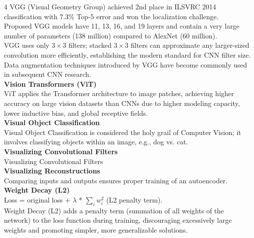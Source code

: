 \documentclass[8pt]{extarticle}
\begin{document}
\begin{multicols}{4}
{VGG (Visual Geometry Group) achieved 2nd place in ILSVRC 2014 classification with 7.3\% Top-5 error and won the localization challenge.\\
Proposed VGG models have 11, 13, 16, and 19 layers and contain a very large number of parameters (138 million) compared to AlexNet (60 million).\\
VGG uses only $3\times3$ filters; stacked $3\times3$ filters can approximate any larger-sized convolution more efficiently, establishing the modern standard for CNN filter size.\\
Data augmentation techniques introduced by VGG have become commonly used in subsequent CNN research.\\
\vspace{2pt}\textbf{Vision Transformers (ViT)}\\
ViT applies the Transformer architecture to image patches, achieving higher accuracy on large vision datasets than CNNs due to higher modeling capacity, lower inductive bias, and global receptive fields.\\
\vspace{2pt}\textbf{Visual Object Classification}\\
Visual Object Classification is considered the holy grail of Computer Vision; it involves classifying objects within an image, e.g., dog vs. cat.\\
\vspace{2pt}\textbf{Visualizing Convolutional Filters}\\
Visualizing Convolutional Filters\\
\vspace{2pt}\textbf{Visualizing Reconstructions}\\
Comparing inputs and outputs ensures proper training of an autoencoder.\\
\vspace{2pt}\textbf{Weight Decay (L2)}\\
Loss = original loss + $\lambda$ * $\sum_{i} w_{i}^{2}$ (L2 penalty term).\\
Weight Decay (L2) adds a penalty term (summation of all weights of the network) to the loss function during training, discouraging excessively large weights and promoting simpler, more generalizable solutions.\\

}
\end{multicols}
\end{document}
